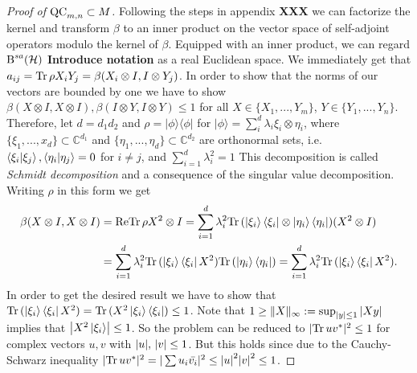 \begin{proof}[Proof of $ \textup{QC}_{m,n} \subset M $]
	Following the steps in appendix \textbf{XXX} we can factorize the kernel and transform $ \beta $ to an inner product on the vector space of self-adjoint operators modulo the kernel of $ \beta $. 
	Equipped with an inner product, we can regard $ \textup{B}^{sa}(\mathcal{H}) $ \textbf{Introduce notation} as a real Euclidean space. 
	We immediately get that $ a_{ij} =\text{Tr} \, {\rho X_i Y_j} =  \beta(X_i \otimes I,I \otimes Y_j) $. In order to show that the norms of our vectors are bounded by one we have to show
	$ \beta(X \otimes I, X \otimes I), \beta(I \otimes Y, I \otimes Y) \le 1$ for all $ X \in \{X_1,...,Y_m \} $, $ Y \in \{Y_1,...,Y_n \} $. 
	Therefore, let $ d = d_1d_2 $ and $ \rho = \vert \phi \rangle \langle \phi \vert $ for $ \vert \phi \rangle = \sum_{i}^{d}\lambda_i \xi_i \otimes \eta_i $, where $ \{ \xi_1,...,x_d \} \subset \mathbb{C}^{d_1}$ and $ \{  \eta_1,...,\eta_d\} \subset \mathbb{C}^{d_2}$ are orthonormal sets, i.e. $ \braket{\xi_i \vert \xi_j}, \braket{\eta_i \vert \eta_j} = 0 $ for $ i \neq j $, and $ \sum_{i=1}^d \lambda_i^2 = 1 $ This decomposition is called {\itshape Schmidt decomposition} and a consequence of the singular value decomposition. Writing $ \rho $ in this form we get 
	\begin{align*}
		\beta(X \otimes I, X \otimes I) &= \textup{Re} \text{Tr} \, {\rho X^2 \otimes I} =  \sum_{i=1}^d \lambda_i^2 \text{Tr} \, {(\ket{\xi_i} \bra{\xi_i} \otimes \ket{\eta_i}\bra{\eta_i})(X^2 \otimes I) }  \\
		&= \sum_{i=1}^{d}\lambda_i^2 \text{Tr} \, {(\ket{\xi_i} \bra{\xi_i}X^2)} \text{Tr} \, {(\ket{\eta_i}\bra{\eta_i})}  =  \sum_{i=1}^{d}\lambda_i^2 \text{Tr} \, {(\ket{\xi_i} \bra{\xi_i}X^2)} .
	\end{align*}
	In order to get the desired result we have to show that $ \text{Tr} \, {(\ket{\xi_i} \bra{\xi_i}X^2)}  = \text{Tr} \, {(X^2\ket{\xi_i} \bra{\xi_i})}  \le 1 $. 
	Note that $1 \ge  \Vert {X} \Vert_{\infty} := \sup_{{\left|{y}\right|}\le 1} {\left|{Xy}\right|} $ implies that $ {\left|{X^2\ket{\xi_i}}\right|} \le 1 $. So the problem can be reduced to $ \vert \text{Tr} \, {uv^*} \vert^2 \le 1 $ for complex vectors $ u,v $ with $ {\left|{u}\right|},\, {\left|{v}\right|} \le 1 $. But this holds since due to the Cauchy-Schwarz inequality 
	$ \vert\text{Tr} \, {uv^*} \vert^2 = \vert\sum u_i \bar{v_i}\vert^2 \le {\left|{u}\right|}^2{\left|{v}\right|}^2 \le 1 $.
	

\end{proof}
